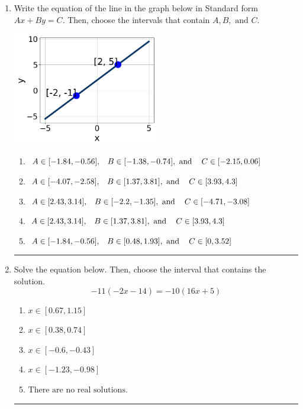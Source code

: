 \documentclass[14pt]{extbook}
\newcommand{\litem}[1]{\item#1\hspace*{-1cm}\rule{\textwidth}{0.4pt}}
\begin{document}
\begin{enumerate}
{\begin{enumerate}[label=\Alph*.]
\end{enumerate} }
\litem{
Write the equation of the line in the graph below in Standard form $Ax+By=C$. Then, choose the intervals that contain $A, B, \text{ and } C$.
\begin{center}
    \includegraphics[width=0.5\textwidth]{../Figures/linearGraphToStandardCopyA.png}
\end{center}
\begin{enumerate}[label=\Alph*.]
\item \( A \in [-1.84, -0.56], \hspace{3mm} B \in [-1.38, -0.74], \text{ and } \hspace{3mm} C \in [-2.15, 0.06] \)
\item \( A \in [-4.07, -2.58], \hspace{3mm} B \in [1.37, 3.81], \text{ and } \hspace{3mm} C \in [3.93, 4.3] \)
\item \( A \in [2.43, 3.14], \hspace{3mm} B \in [-2.2, -1.35], \text{ and } \hspace{3mm} C \in [-4.71, -3.08] \)
\item \( A \in [2.43, 3.14], \hspace{3mm} B \in [1.37, 3.81], \text{ and } \hspace{3mm} C \in [3.93, 4.3] \)
\item \( A \in [-1.84, -0.56], \hspace{3mm} B \in [0.48, 1.93], \text{ and } \hspace{3mm} C \in [0, 3.52] \)

\end{enumerate} }
\litem{
Solve the equation below. Then, choose the interval that contains the solution.\[ -11(-2x -14) = -10(16x + 5) \]\begin{enumerate}[label=\Alph*.]
\item \( x \in [0.67, 1.15] \)
\item \( x \in [0.38, 0.74] \)
\item \( x \in [-0.6, -0.43] \)
\item \( x \in [-1.23, -0.98] \)
\item \( \text{There are no real solutions.} \)


\end{enumerate}}
\end{enumerate}
\end{document}
